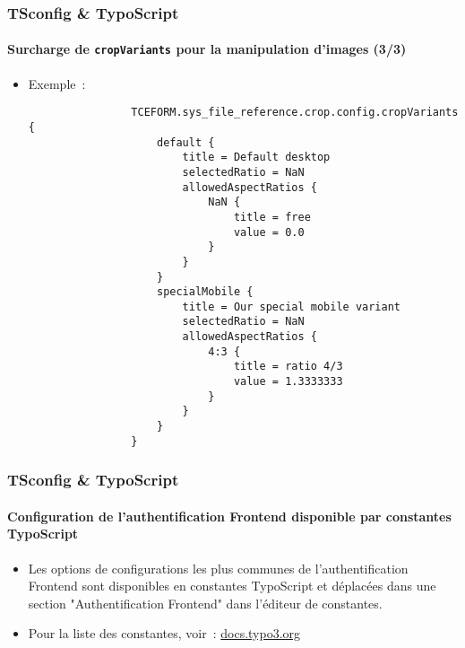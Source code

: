 
\begin{frame}[fragile]
	\frametitle{TSconfig \& TypoScript}
	\framesubtitle{Surcharge de \texttt{cropVariants} pour la manipulation d'images (3/3)}

	\lstset{basicstyle=\tiny\ttfamily}

	\begin{itemize}
		\item Exemple~:

			\begin{lstlisting}
				TCEFORM.sys_file_reference.crop.config.cropVariants {
				    default {
				        title = Default desktop
				        selectedRatio = NaN
				        allowedAspectRatios {
				            NaN {
				                title = free
				                value = 0.0
				            }
				        }
				    }
				    specialMobile {
				        title = Our special mobile variant
				        selectedRatio = NaN
				        allowedAspectRatios {
				            4:3 {
				                title = ratio 4/3
				                value = 1.3333333
				            }
				        }
				    }
				}
			\end{lstlisting}

	\end{itemize}

\end{frame}



\begin{frame}[fragile]
	\frametitle{TSconfig \& TypoScript}
	\framesubtitle{Configuration de l'authentification Frontend disponible par constantes TypoScript}

	\begin{itemize}
		\item Les options de configurations les plus communes de l'authentification Frontend
		  	sont disponibles en constantes TypoScript et déplacées dans une section "Authentification
		  	Frontend" dans l'éditeur de constantes.

		\item Pour la liste des constantes, voir~:
			\href{https://docs.typo3.org/typo3cms/extensions/core/8-dev/singlehtml/Index.html#feature-80374-frontend-login-configuration-now-available-through-typoscript-constants}{docs.typo3.org}
	\end{itemize}

\end{frame}

